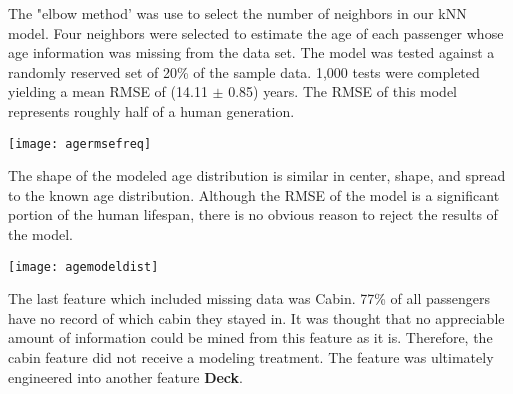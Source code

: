 \documentclass[10pt]{article}
\begin{document}
\begin{multicols}{2}
	The "elbow method' was use to select the number of neighbors in our kNN model.
	Four neighbors were selected to estimate the age of each passenger whose age information was missing from the data set.
	The model was tested against a randomly reserved set of 20\% of the sample data.
	1,000 tests were completed yielding a mean RMSE of (14.11 $\pm$ 0.85) years.
	The RMSE of this model represents roughly half of a human generation.
	\begin{center}
	\texttt{[image: agermsefreq]}\\
	\end{center}

	The shape of the modeled age distribution is similar in center, shape, and spread to the known age distribution.
	Although the RMSE of the model is a significant portion of the human lifespan, there is no obvious reason to reject the results of the model.
	\begin{center}
	\texttt{[image: agemodeldist]}\\
	\end{center}

	The last feature which included missing data was Cabin.
	77\% of all passengers have no record of which cabin they stayed in.
	It was thought that no appreciable amount of information could be mined from this feature as it is.
	Therefore, the cabin feature did not receive a modeling treatment.
	The feature was ultimately engineered into another feature \textbf{Deck}.


\end{multicols}
\end{document}
